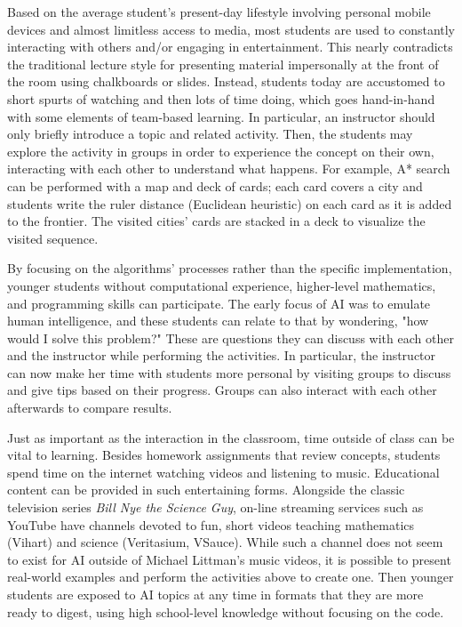 \documentclass[letterpaper]{article}
\begin{document}
Based on the average student's present-day lifestyle involving personal mobile devices and almost limitless access to media, most students are used to constantly interacting with others and/or engaging in entertainment.  This nearly contradicts the traditional lecture style for presenting material impersonally at the front of the room using chalkboards or slides.  Instead, students today are accustomed to short spurts of watching and then lots of time doing, which goes hand-in-hand with some elements of team-based learning.  In particular, an instructor should only briefly introduce a topic and related activity.  Then, the students may explore the activity in groups in order to experience the concept on their own, interacting with each other to understand what happens.  For example, A* search can be performed with a map and deck of cards; each card covers a city and students write the ruler distance (Euclidean heuristic) on each card as it is added to the frontier.  The visited cities' cards are stacked in a deck to visualize the visited sequence.

By focusing on the algorithms' processes rather than the specific implementation, younger students without computational experience, higher-level mathematics, and programming skills can participate.  The early focus of AI was to emulate human intelligence, and these students can relate to that by wondering, "how would I solve this problem?"  These are questions they can discuss with each other and the instructor while performing the activities.  In particular, the instructor can now make her time with students more personal by visiting groups to discuss and give tips based on their progress.  Groups can also interact with each other afterwards to compare results. 

Just as important as the interaction in the classroom, time outside of class can be vital to learning.  Besides homework assignments that review concepts, students spend time on the internet watching videos and listening to music.  Educational content can be provided in such entertaining forms.  Alongside the classic television series {\em Bill Nye the Science Guy}, on-line streaming services such as YouTube have channels devoted to fun, short videos teaching mathematics (Vihart) and science (Veritasium, VSauce).  While such a channel does not seem to exist for AI outside of Michael Littman's music videos, it is possible to present real-world examples and perform the activities above to create one. Then younger students are exposed to AI topics at any time in formats that they are more ready to digest, using high school-level knowledge without focusing on the code.
\end{document}
